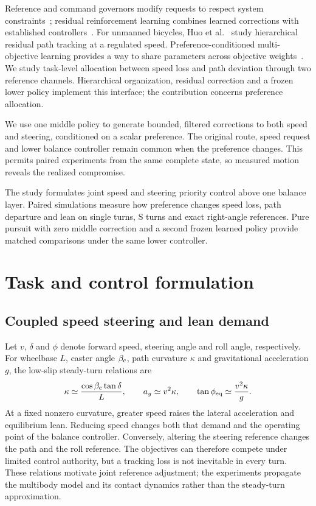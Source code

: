 \documentclass[final,5p,times,twocolumn]{elsarticle}
\begin{document}
Reference and command governors modify requests to respect system constraints~\cite{garone2017}; residual reinforcement learning combines learned corrections with established controllers~\cite{johannink2019}. For unmanned bicycles, Huo et al.~\cite{huo2025} study hierarchical residual path tracking at a regulated speed. Preference-conditioned multi-objective learning provides a way to share parameters across objective weights~\cite{abels2019}. We study task-level allocation between speed loss and path deviation through two reference channels. Hierarchical organization, residual correction and a frozen lower policy implement this interface; the contribution concerns preference allocation.

We use one middle policy to generate bounded, filtered corrections to both speed and steering, conditioned on a scalar preference. The original route, speed request and lower balance controller remain common when the preference changes. This permits paired experiments from the same complete state, so measured motion reveals the realized compromise.

The study formulates joint speed and steering priority control above one balance layer. Paired simulations measure how preference changes speed loss, path departure and lean on single turns, S turns and exact right-angle references. Pure pursuit with zero middle correction and a second frozen learned policy provide matched comparisons under the same lower controller.

\section{Task and control formulation}
\label{sec:problem}
\subsection{Coupled speed steering and lean demand}
Let $v$, $\delta$ and $\phi$ denote forward speed, steering angle and roll angle, respectively. For wheelbase $L$, caster angle $\beta_{\rm c}$, path curvature $\kappa$ and gravitational acceleration $g$, the low-slip steady-turn relations are
\begin{equation}
\kappa\simeq\frac{\cos\beta_{\rm c}\tan\delta}{L},\qquad
 a_y\simeq v^2\kappa,\qquad
 \tan\phi_{\rm eq}\simeq\frac{v^2\kappa}{g}.
\label{eq:coupling}
\end{equation}
At a fixed nonzero curvature, greater speed raises the lateral acceleration and equilibrium lean. Reducing speed changes both that demand and the operating point of the balance controller. Conversely, altering the steering reference changes the path and the roll reference. The objectives can therefore compete under limited control authority, but a tracking loss is not inevitable in every turn. These relations motivate joint reference adjustment; the experiments propagate the multibody model and its contact dynamics rather than the steady-turn approximation.
\end{document}
